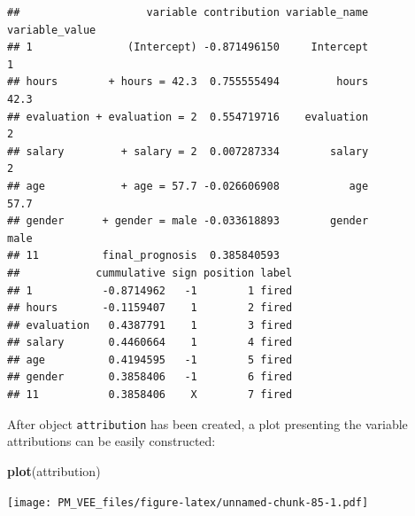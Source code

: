 \documentclass[12pt,]{krantz}
\newenvironment{Shaded}{\begin{snugshade}}{\end{snugshade}}
\newcommand{\KeywordTok}[1]{\textcolor[rgb]{0.13,0.29,0.53}{\textbf{#1}}}
\newcommand{\NormalTok}[1]{#1}
\theoremstyle{definition}
\theoremstyle{definition}
\theoremstyle{definition}
\theoremstyle{remark}
\begin{document}
\begin{verbatim}
##                    variable contribution variable_name variable_value
## 1               (Intercept) -0.871496150     Intercept              1
## hours        + hours = 42.3  0.755555494         hours           42.3
## evaluation + evaluation = 2  0.554719716    evaluation              2
## salary         + salary = 2  0.007287334        salary              2
## age            + age = 57.7 -0.026606908           age           57.7
## gender      + gender = male -0.033618893        gender           male
## 11          final_prognosis  0.385840593                             
##            cummulative sign position label
## 1           -0.8714962   -1        1 fired
## hours       -0.1159407    1        2 fired
## evaluation   0.4387791    1        3 fired
## salary       0.4460664    1        4 fired
## age          0.4194595   -1        5 fired
## gender       0.3858406   -1        6 fired
## 11           0.3858406    X        7 fired
\end{verbatim}

After object \texttt{attribution} has been created, a plot presenting
the variable attributions can be easily constructed:

\begin{Shaded}
\begin{Highlighting}[]
\KeywordTok{plot}\NormalTok{(attribution)}
\end{Highlighting}
\end{Shaded}

\texttt{[image: PM\_VEE\_files/figure-latex/unnamed-chunk-85-1.pdf]}


\end{document}

